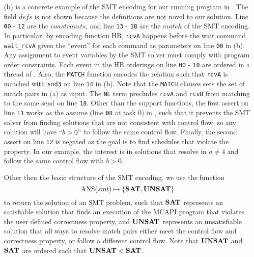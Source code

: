  (b) is a concrete example of the SMT encoding for our running program in . The field $\mathit{defs}$ is not shown because the definitions are not novel to our solution. Line \texttt{00} - \texttt{12} are the $\mathit{constraints}$, and line \texttt{13} - \texttt{18} are the $\mathit{match}$ of the SMT encoding. In particular, by encoding function $\mathrm{HB}$, \texttt{rcvA} happens before the wait command \texttt{wait\_rcvA} given the ``event'' for each command as parameters on line \texttt{00} in  (b). Any assignment to event variables by the SMT solver must comply with program order constraints. Each event in the $\mathrm{HB}$ orderings on line \texttt{00} - \texttt{10} are ordered in a thread of . Also, the \texttt{MATCH} function encodes the relation such that \texttt{rcvA} is matched with \texttt{snd3} on line \texttt{14} in  (b). Note that the \texttt{MATCH} clauses sets the set of match pairs in  (a) as input. The \texttt{NE} term precludes \texttt{rcvA} and \texttt{rcvB} from matching to the same send on line \texttt{18}. Other than the support functions, the first assert on line \texttt{11} works as the assume (line \texttt{08} at task 0) in , such that it prevents the SMT solver from finding solutions that are not consistent with control flow, so any solution will have $``b > 0"$ to follow the same control flow. Finally, the second assert on line \texttt{12} is negated as the goal is to find schedules that violate the property. In our example, the interest is in solutions that resolve in $a \neq 4$ and follow the same control flow with $b > 0$.

Other then the basic structure of the SMT encoding, we use the function
\[\mathrm{ANS}(\mathit{smt}) \mapsto \{\mathrm{\textbf{SAT}},\mathrm{\textbf{UNSAT}}\} \]
to return the solution of an SMT problem, such that $\mathrm{\textbf{SAT}}$ represents an satisfiable solution that finds an execution of the MCAPI program that violates the user defined correctness property, and $\mathrm{\textbf{UNSAT}}$ represents an unsatisfiable solution that all ways to resolve match pairs either meet the control flow and correctness property, or follow a different control flow. Note that $\mathrm{\textbf{UNSAT}}$ and $\mathrm{\textbf{SAT}}$ are ordered such that $\mathrm{\textbf{UNSAT}} < \mathrm{\textbf{SAT}}$.

